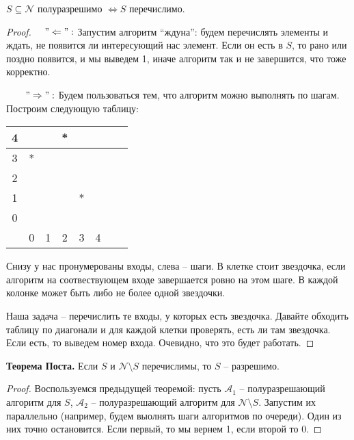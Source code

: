 \begin{theorem}
    $S \subseteq \mathcal{N}$ полуразрешимо $\Longleftrightarrow S$ перечислимо. 
\end{theorem}
\begin{proof}
    \quad 

    \quad $\quad"\Leftarrow":$ Запустим алгоритм ``ждуна'': будем перечислять элементы и ждать, не появится ли интересующий нас элемент. Если он есть в $S$, то рано или поздно появится, и мы выведем 1, иначе алгоритм так и не завершится, что тоже корректно.
    
    $\quad\quad "\Rightarrow":$ Будем пользоваться тем, что алгоритм можно выполнять по шагам. Построим следующую таблицу:
    \begin{center}
        \begin{tabular}{|c|| c | c | c| c | c | c | c |} 
         \hline
        4 &  &  & * & & \\ 
         \hline
        3 & * &  & & &  \\
         \hline
         2 &  &  & & &  \\
         \hline
         1 &  &  & & * &  \\
         \hline
         0 &  &  & & &  \\
         \hline\hline
          & 0  & 1  & 2 & 3 & 4 \\
         \hline
        \end{tabular}
    \end{center}
    \quad Снизу у нас пронумерованы входы, слева -- шаги. В клетке стоит звездочка, если алгоритм на соотвествующем входе завершается ровно на этом шаге. В каждой колонке может быть либо не более одной звездочки. 
    
    \quad Наша задача -- перечислить те входы, у которых есть звездочка. Давайте обходить таблицу по диагонали и для каждой клетки проверять, есть ли там звездочка. Если есть, то выведем номер входа. Очевидно, что это будет работать.
\end{proof}

\textbf{Теорема Поста.} Если $S$ и $\mathcal{N} \setminus S$ перечислимы, то $S$ -- разрешимо.

\begin{proof}
    Воспользуемся предыдущей теоремой: пусть $\mathcal{A}_1$ -- полуразрешающий алгоритм для $S$, $\mathcal{A}_2$ -- полуразрешающий алгоритм для $\mathcal{N} \setminus S$. Запустим их параллельно (например, будем выолнять шаги алгоритмов по очереди). Один из них точно остановится. Если первый, то мы вернем 1, если второй то 0.
\end{proof}


